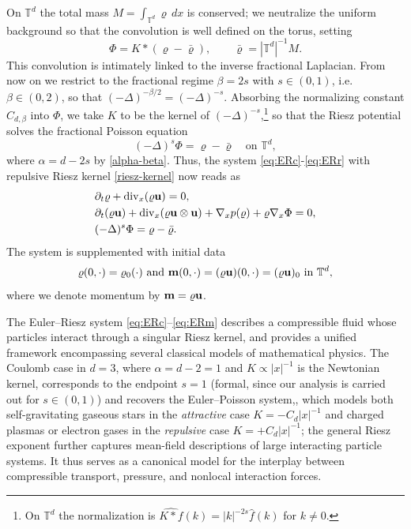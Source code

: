 \documentclass[12pt,a4paper,twoside]{article}
\newcommand{\Div}{\operatorname{div}}
\newcommand{\vr}{\varrho}
\newcommand{\vu}{\vc{u}}
\newcommand{\vc}[1]{{\bf #1}}
\newcommand{\Grad}{\nabla}
\numberwithin{equation}{section}%
\newcommand{\T}{\mathbb{T}}
\newcommand{\vm}{\vc{m}}
\begin{document}
On $\mathbb T^d$ the total mass $M=\int_{\mathbb T^d}\vr\,dx$ is conserved; we neutralize the
uniform background so that the convolution is well defined on the torus, setting
\begin{equation*}
	\Phi = K \ast (\vr - \bar{\vr}), \qquad \bar{\vr} = |\mathbb{T}^d|^{-1} M .
\end{equation*}
This convolution is intimately linked to the inverse fractional Laplacian. From now on we
restrict to the fractional regime $\beta = 2s$ with $s\in(0,1)$, i.e.\ $\beta\in(0,2)$, so that
$(-\Delta)^{-\beta/2} = (-\Delta)^{-s}$. Absorbing the normalizing constant $C_{d,\beta}$ into
$\Phi$, we take $K$ to be the kernel of $(-\Delta)^{-s}$,\footnote{On $\mathbb T^d$ the
	normalization is $\widehat{K\ast f}(k)=|k|^{-2s}\hat f(k)$ for $k\neq0$.} so that the Riesz
potential solves the fractional Poisson equation
\begin{equation*}%
	(-\Delta)^s \Phi = \vr - \bar{\vr} \quad \text{on } \mathbb{T}^d,
\end{equation*}
where $\alpha = d - 2s$ by \eqref{alpha-beta}. Thus, the system \eqref{eq:ERc}-\eqref{eq:ERr} with repulsive Riesz kernel \eqref{riesz-kernel} now reads as
	\begin{align}
		& \partial_t \vr + \Div_x( \vr \vu ) = 0, \label{eq:ERc}\\
		& \partial_t(\vr \vu) + \Div_x (\vr \vu \otimes \vu ) + \Grad_x p(\vr) + \vr \Grad_x \Phi = 0,\label{eq:ERm} \\
		&(-\Delta)^s \Phi = \vr - \bar{\vr}. \label{eq:ERr}
	\end{align}
	The system is supplemented with initial data 
	\begin{align}\label{id}
		\vr(0,\cdot) = \vr_0 (\cdot) \text{ and } \mathbf{m}(0,\cdot)=(\vr \vu) (0,\cdot) =(\vr \vu)_0 \text{ in } \T^d,
	\end{align}
	where we denote momentum by $\vm=\vr \vu$.
	
	The Euler--Riesz system \eqref{eq:ERc}--\eqref{eq:ERm} describes a compressible fluid whose particles interact through a singular Riesz kernel, and provides a unified framework encompassing several classical models of mathematical physics. The Coulomb case in $d=3$, where $\alpha=d-2=1$ and $K\propto|x|^{-1}$ is the Newtonian
	kernel, corresponds to the endpoint $s=1$ (formal, since our analysis is carried out for
	$s\in(0,1)$) and recovers the Euler--Poisson system,, which models both self-gravitating gaseous stars in the \emph{attractive} case $K = -C_{d}|x|^{-1}$ and charged plasmas or electron gases in the \emph{repulsive} case $K = +C_{d}|x|^{-1}$; the general Riesz exponent further captures mean-field descriptions of large interacting particle systems. It thus serves as a canonical model for the interplay between compressible transport, pressure, and nonlocal interaction forces.
	
\end{document}
